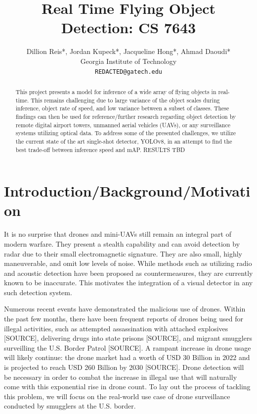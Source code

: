 \documentclass[10pt,twocolumn,letterpaper]{article}
\begin{document}
\title{Real Time Flying Object Detection: CS 7643}

\author{Dillion Reis*, Jordan Kupeck*, Jacqueline Hong*, Ahmad Daoudi*\\
Georgia Institute of Technology\\
{\tt\small {REDACTED}@gatech.edu}
}

\maketitle

\begin{abstract}
   This project presents a model for inference of a wide array of flying objects in real-time. 
   This remains challenging due to large variance of the object scales during inference, object rate of speed, 
   and low variance between a subset of classes. These findings can then be used for reference/further research 
   regarding object detection by remote digital airport towers, unmanned aerial vehicles (UAVs), or any surveillance 
   systems utilizing optical data. To address some of the presented challenges, we utilize the current state of the art 
   single-shot detector, YOLOv8, in an attempt to find the best trade-off between inference speed and mAP. RESULTS TBD
\end{abstract}

\section{Introduction/Background/Motivation}
It is no surprise that drones and mini-UAVs still remain an integral part of modern warfare. They present a stealth capability and can avoid detection by radar due to their small electromagnetic signature. They are also small, highly maneuverable, and omit low levels of noise. While methods such as utilizing radio and acoustic detection have been proposed as countermeasures, they are currently known to be inaccurate. This motivates the integration of a visual detector in any such detection system.

Numerous recent events have demonstrated the malicious use of drones. Within the past few months, there have been frequent reports of drones being used for illegal activities, such as attempted assassination with attached explosives [SOURCE], delivering drugs into state prisons [SOURCE], and migrant smugglers surveilling the U.S. Border Patrol [SOURCE]. A rampant increase in drone usage will likely continue: the drone market had a worth of USD 30 Billion in 2022 and is projected to reach USD 260 Billion by 2030 [SOURCE]. Drone detection will be necessary in order to combat the increase in illegal use that will naturally come with this exponential rise in drone count. To lay out the process of tackling this problem, we will focus on the real-world use case of drone surveillance conducted by smugglers at the U.S. border.
\end{document}
